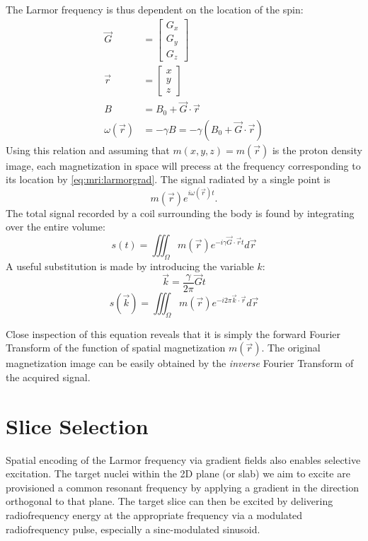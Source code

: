 The Larmor frequency is thus dependent on the location of the spin:
\begin{align}
\vec{G} &= \left[\begin{matrix}G_x\\G_y\\G_z\end{matrix}\right]\\
\vec{r} &= \left[\begin{matrix}x\\y\\z\end{matrix}\right]\\
B &= B_0 + \vec{G}\cdot \vec{r}\\
\omega(\vec{r}) &= -\gamma B = -\gamma\left(B_0 + \vec{G}\cdot \vec{r}\right) \label{eq:mri:larmorgrad}
\end{align}
Using this relation and assuming that $m(x,y,z) = m(\vec{r})$ is the proton density image, each magnetization in space will precess at the frequency corresponding to its location by \ref{eq:mri:larmorgrad}. The signal radiated by a single point is 
\begin{equation}
m(\vec{r})e^{i\omega(\vec{r})t}.
\end{equation}
The total signal recorded by a coil surrounding the body is found by integrating over the entire volume:
\begin{equation}
s(t) = \iiint_{\Omega}m(\vec{r})e^{-i\gamma \vec{G}\cdot\vec{r}t}d\vec{r}
\end{equation}
A useful substitution is made by introducing the variable $k$:
\begin{equation}
\vec{k} = \frac{\gamma}{2\pi} \vec{G}t
\end{equation}
\begin{equation}
s(\vec{k}) = \iiint_{\Omega}m(\vec{r})e^{-i2\pi \vec{k}\cdot\vec{r}}d\vec{r}
\end{equation}

Close inspection of this equation reveals that it is simply the forward Fourier Transform of the function of spatial magnetization $m(\vec{r})$. The original magnetization image can be easily obtained by the \textit{inverse} Fourier Transform of the acquired signal.
\section{Slice Selection}
Spatial encoding of the Larmor frequency via gradient fields also enables selective excitation. The target nuclei within the 2D plane (or slab) we aim to excite are provisioned a common resonant frequency by applying a gradient in the direction orthogonal to that plane. The target slice can then be excited by delivering radiofrequency energy at the appropriate frequency via a modulated radiofrequency pulse, especially a sinc-modulated sinusoid. 


